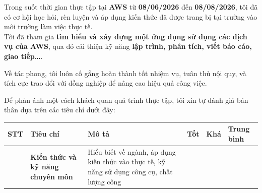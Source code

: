 Trong suốt thời gian thực tập tại \textbf{AWS} từ \textbf{08/06/2026}
đến \textbf{08/08/2026}, tôi đã có cơ hội học hỏi, rèn luyện và áp dụng
kiến thức đã được trang bị tại trường vào môi trường làm việc thực tế.\\
Tôi đã tham gia \textbf{tìm hiểu và xây dựng một ứng dụng sử dụng các
dịch vụ của AWS}, qua đó cải thiện kỹ năng \textbf{lập trình, phân tích,
viết báo cáo, giao tiếp\ldots{}}.

Về tác phong, tôi luôn cố gắng hoàn thành tốt nhiệm vụ, tuân thủ nội
quy, và tích cực trao đổi với đồng nghiệp để nâng cao hiệu quả công
việc.

Để phản ánh một cách khách quan quá trình thực tập, tôi xin tự đánh giá
bản thân dựa trên các tiêu chí dưới đây:

{\def\LTcaptype{none} %
\begingroup
\small
\setlength{\tabcolsep}{3pt}
\renewcommand{\arraystretch}{1.15}
\begin{longtable}[]{@{}
  >{\raggedright\arraybackslash}p{}
  >{\raggedright\arraybackslash}p{}
  >{\raggedright\arraybackslash}p{}
  >{\raggedright\arraybackslash}p{}
  >{\raggedright\arraybackslash}p{}
  >{\raggedright\arraybackslash}p{}@{}}
\toprule\noalign{}
\begin{minipage}[b]{\linewidth}\raggedright
STT
\end{minipage} & \begin{minipage}[b]{\linewidth}\raggedright
Tiêu chí
\end{minipage} & \begin{minipage}[b]{\linewidth}\raggedright
Mô tả
\end{minipage} & \begin{minipage}[b]{\linewidth}\raggedright
Tốt
\end{minipage} & \begin{minipage}[b]{\linewidth}\raggedright
Khá
\end{minipage} & \begin{minipage}[b]{\linewidth}\raggedright
Trung bình
\end{minipage} \\
\midrule\noalign{}
\endhead
\bottomrule\noalign{}
\endlastfoot
1 & \textbf{Kiến thức và kỹ năng chuyên môn} & Hiểu biết về ngành, áp
dụng kiến thức vào thực tế, kỹ năng sử dụng công cụ, chất lượng công

\end{longtable}}
